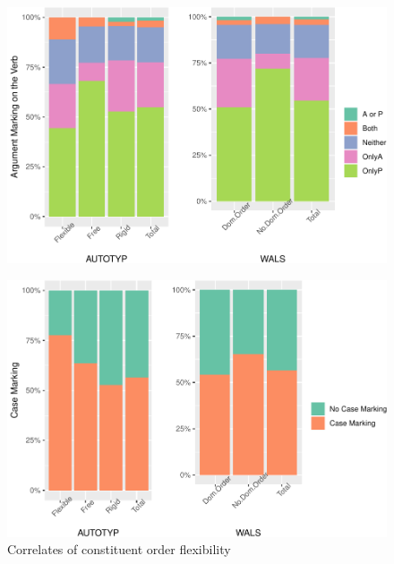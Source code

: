 \documentclass[10pt,letterpaper]{article}
\begin{document}
\begin{figure}[b]
\centering

\caption{Correlates of constituent order flexibility}\label{fig:correlates}

\begin{minipage}[c]{0.45\textwidth}

\label{fig:flex_marking}

\includegraphics{flexibility_factors_abstract_files/figure-latex/flex_marking-1}

\end{minipage} %
\begin{minipage}[c]{0.45\textwidth}

\label{fig:flex_case}

\includegraphics{flexibility_factors_abstract_files/figure-latex/flex_case-1}

\end{minipage}
\end{figure}
\end{document}
